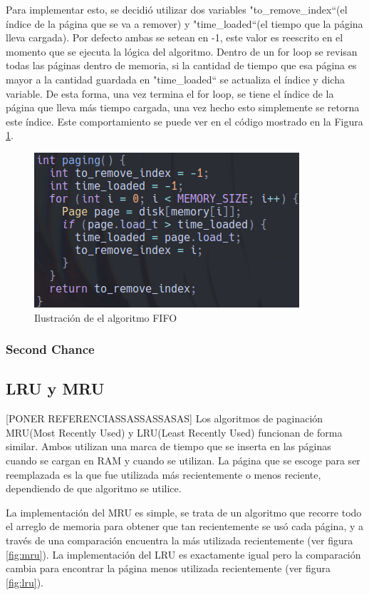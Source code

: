 \documentclass{report}
\begin{document}
Para implementar esto, se decidió utilizar dos variables "to\_remove\_index``(el índice de la página que se va a remover) y "time\_loaded``(el tiempo que la página lleva cargada). 
Por defecto ambas se setean en -1, este valor es reescrito en el momento que se ejecuta la lógica del algoritmo.
Dentro de un for loop se revisan todas las páginas dentro de memoria, si la cantidad de tiempo que esa página es mayor a la cantidad guardada en "time\_loaded`` se actualiza el índice y dicha variable.
De esta forma, una vez termina el for loop, se tiene el índice de la página que lleva más tiempo cargada, una vez hecho esto simplemente se retorna este índice.
Este comportamiento se puede ver en el código mostrado en la Figura \ref{fig:fifo}.

\begin{figure}[h]
  \centering
  \includegraphics[width=0.8\linewidth]{figuras/fifo.png}
  \caption{Ilustración de el algoritmo FIFO}
  \label{fig:fifo}
\end{figure}

\subsubsection{Second Chance}

\subsection{LRU y MRU}
[PONER REFERENCIASSASSASSASAS]
Los algoritmos de paginación MRU(Most Recently Used) y LRU(Least Recently Used) funcionan de forma similar.  Ambos utilizan una marca de tiempo que se inserta en las páginas cuando se cargan en RAM y cuando se utilizan.  La página que se escoge para ser reemplazada es la que fue utilizada más recientemente o menos reciente, dependiendo de que algoritmo se utilice.

La implementación del MRU es simple, se trata de un algoritmo que recorre todo el arreglo de memoria para obtener que tan recientemente se usó cada página, y a través de una comparación encuentra la más utilizada recientemente (ver figura \ref{fig:mru}). La implementación del LRU es exactamente igual pero la comparación cambia para encontrar la página menos utilizada recientemente (ver figura \ref{fig:lru}).
\end{document}
